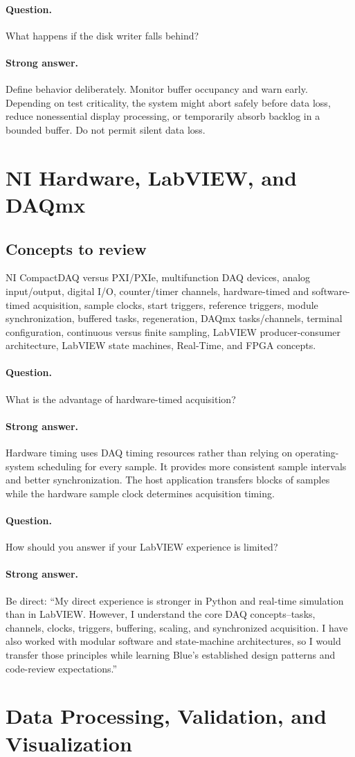 \documentclass[11pt]{article}
\newcommand{\q}[1]{\paragraph{Question.} #1}
\newcommand{\ans}[1]{\paragraph{Strong answer.} #1}
\begin{document}
\q{What happens if the disk writer falls behind?}
\ans{Define behavior deliberately. Monitor buffer occupancy and warn early.
Depending on test criticality, the system might abort safely before data loss,
reduce nonessential display processing, or temporarily absorb backlog in a
bounded buffer. Do not permit silent data loss.}

\section{NI Hardware, LabVIEW, and DAQmx}

\subsection{Concepts to review}
NI CompactDAQ versus PXI/PXIe, multifunction DAQ devices, analog input/output,
digital I/O, counter/timer channels, hardware-timed and software-timed
acquisition, sample clocks, start triggers, reference triggers, module
synchronization, buffered tasks, regeneration, DAQmx tasks/channels, terminal
configuration, continuous versus finite sampling, LabVIEW producer-consumer
architecture, LabVIEW state machines, Real-Time, and FPGA concepts.

\q{What is the advantage of hardware-timed acquisition?}
\ans{Hardware timing uses DAQ timing resources rather than relying on
operating-system scheduling for every sample. It provides more consistent sample
intervals and better synchronization. The host application transfers blocks of
samples while the hardware sample clock determines acquisition timing.}

\q{How should you answer if your LabVIEW experience is limited?}
\ans{Be direct: ``My direct experience is stronger in Python and real-time
simulation than in LabVIEW. However, I understand the core DAQ concepts--tasks,
channels, clocks, triggers, buffering, scaling, and synchronized acquisition. I
have also worked with modular software and state-machine architectures, so I
would transfer those principles while learning Blue's established design
patterns and code-review expectations.''}

\section{Data Processing, Validation, and Visualization}
\end{document}
